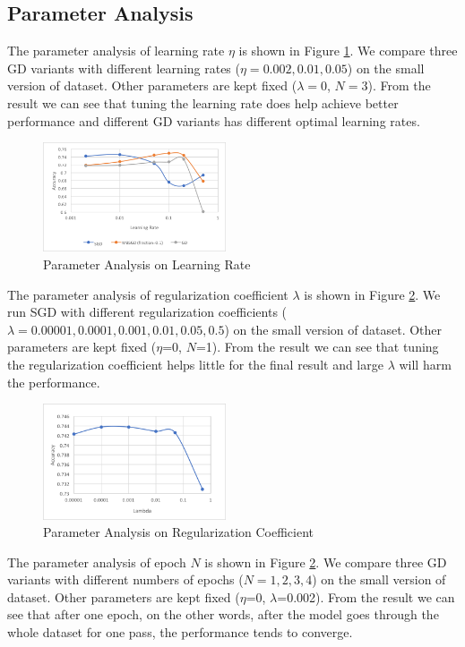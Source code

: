 \documentclass[sigconf]{acmart}
\begin{document}
\subsection{Parameter Analysis}
\label{subsection:ParameterAnalysis}
The parameter analysis of learning rate $\eta$ is shown in Figure \ref{lr}. We compare three GD variants with different learning rates ($\eta = 0.002, 0.01, 0.05$) on the small version of dataset. Other parameters are kept fixed ($\lambda = 0$, $N = 3$). From the result we can see that tuning the learning rate does help achieve better performance and different GD variants has different optimal learning rates.

\begin{figure}[ht]
\centering
\includegraphics[width=0.48\textwidth]{lr.png}
\caption{Parameter Analysis on Learning Rate}
\label{lr}
\end{figure}

The parameter analysis of regularization coefficient $\lambda$ is shown in Figure \ref{reg}. We run SGD with different regularization coefficients ($\lambda = 0.00001, 0.0001, 0.001, 0.01, 0.05, 0.5$) on the small version of dataset. Other parameters are kept fixed ($\eta$=0, $N$=1). From the result we can see that tuning the regularization coefficient helps little for the final result and large $\lambda$ will harm the performance.

\begin{figure}[ht]
\centering
\includegraphics[width=0.48\textwidth]{reg.png}
\caption{Parameter Analysis on Regularization Coefficient}
\label{reg}
\end{figure}

The parameter analysis of epoch $N$ is shown in Figure \ref{reg}. We compare three GD variants with different numbers of epochs ($N = 1, 2, 3, 4$) on the small version of dataset. Other parameters are kept fixed ($\eta$=0, $\lambda$=0.002). From the result we can see that after one epoch, on the other words, after the model goes through the whole dataset for one pass, the performance tends to converge.
\end{document}
